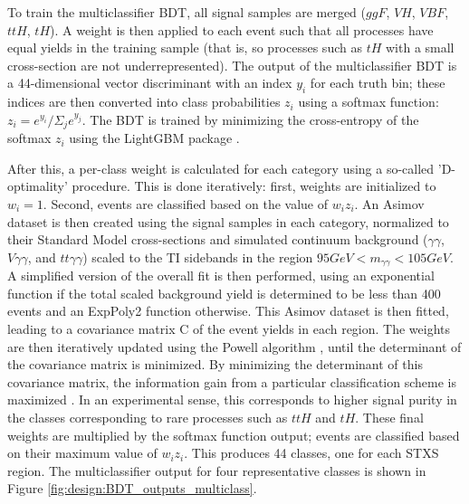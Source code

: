 To train the multiclassifier BDT, all signal samples are merged ($ggF$, $VH$, $VBF$, $ttH$, $tH$). A weight is then applied to each event such that all processes have equal yields in the training sample (that is, so processes such as $tH$ with a small cross-section are not underrepresented). The output of the multiclassifier BDT is a 44-dimensional vector discriminant with an index $y_{i}$ for each truth bin; these indices are then converted into class probabilities $z_{i}$ using a softmax function: $z_{i} = e^{y_{i}}/{\Sigma_{j}e^{y_{j}}}$. The BDT is trained by minimizing the cross-entropy of the softmax $z_{i}$ using the LightGBM package \cite{LightGBM}.

After this, a per-class weight is calculated for each category using a so-called 'D-optimality' procedure. This is done iteratively: first, weights are initialized to $w_{i} = 1$. Second, events are classified based on the value of $w_{i}z_{i}$. An Asimov dataset \cite{Asimov} is then created using the signal samples in each category, normalized to their Standard Model cross-sections and simulated continuum background ($\gamma\gamma$, $V\gamma\gamma$, and $tt\gamma\gamma$) scaled to the TI sidebands in the region $95 GeV < m_{\gamma \gamma} < 105 GeV$. A simplified version of the overall fit is then performed, using an exponential function if the total scaled background yield is determined to be less than 400 events and an ExpPoly2 function otherwise. This Asimov dataset is then fitted, leading to a covariance matrix C of the event yields in each region. The weights are then iteratively updated using the Powell algorithm \cite{Powell}, until the determinant of the covariance matrix is minimized. By minimizing the determinant of this covariance matrix, the information gain from a particular classification scheme is maximized \cite{Lindley}. In an experimental sense, this corresponds to higher signal purity in the classes corresponding to rare processes such as $ttH$ and $tH$. These final weights are multiplied by the softmax function output; events are classified based on their maximum value of $w_{i}z_{i}$. This produces 44 classes, one for each STXS region. The multiclassifier output for four representative classes is shown in Figure \ref{fig:design:BDT_outputs_multiclass}.


